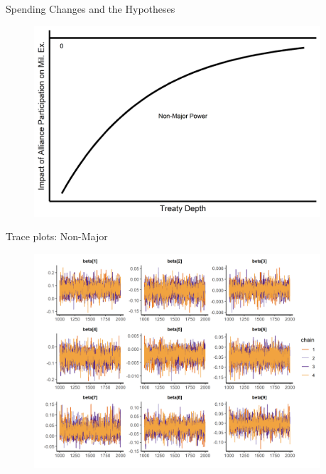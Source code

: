 \documentclass[12pt]{beamer}
\begin{document}

\begin{frame}{Spending Changes and the Hypotheses}

\begin{figure}
	\centering
		\includegraphics[width=0.95\textwidth]{illus-arg.png}
	\label{fig:illus-arg}
\end{figure}


\end{frame}



\begin{frame}{Trace plots: Non-Major}

\begin{figure}
	\centering
		\includegraphics[width=0.95\textwidth]{beta-trace-maj.png}
\end{figure}


\end{frame}
\end{document}
